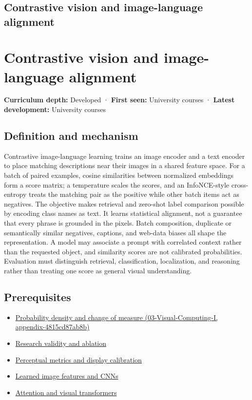 \hypertarget{appendix-772f1fd96148}{}
\section*{Contrastive vision and image-language alignment}
\chapter{Contrastive vision and image-language alignment}\label{appendix-772f1fd96148-contrastive-vision-and-image-language-alignment}

\textbf{Curriculum depth:} Developed · \textbf{First seen:} University courses · \textbf{Latest development:} University courses

\section{Definition and mechanism}\label{appendix-772f1fd96148-definition-and-mechanism}

Contrastive image-language learning trains an image encoder and a text encoder to place matching descriptions near their images in a shared feature space. For a batch of paired examples, cosine similarities between normalized embeddings form a score matrix; a temperature scales the scores, and an InfoNCE-style cross-entropy treats the matching pair as the positive while other batch items act as negatives. The objective makes retrieval and zero-shot label comparison possible by encoding class names as text. It learns statistical alignment, not a guarantee that every phrase is grounded in the pixels. Batch composition, duplicate or semantically similar negatives, captions, and web-data biases all shape the representation. A model may associate a prompt with correlated context rather than the requested object, and similarity scores are not calibrated probabilities. Evaluation must distinguish retrieval, classification, localization, and reasoning rather than treating one score as general visual understanding.

\section{Prerequisites}\label{appendix-772f1fd96148-prerequisites}

\begin{itemize}
\tightlist
\item
  \href{../03-Visual-Computing-I/main.pdf\#nameddest=appendix-4815cd87ab8b}{Probability density and change of measure (03-Visual-Computing-I, appendix-4815cd87ab8b)}
\item
  \hyperref[appendix-65788587ef78]{Research validity and ablation}
\item
  \hyperref[appendix-b2c1846508bf]{Perceptual metrics and display calibration}
\item
  \hyperref[appendix-47c51ea026fb]{Learned image features and CNNs}
\item
  \hyperref[appendix-a9d5dfdd164a]{Attention and visual transformers}
\end{itemize}

